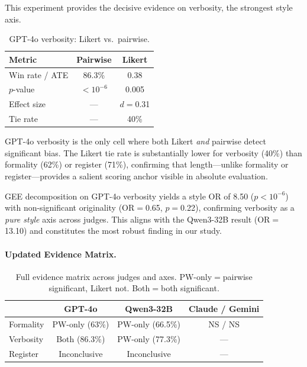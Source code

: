 \documentclass[11pt,a4paper]{article}
\begin{document}
This experiment provides the decisive evidence on verbosity, the strongest style axis.

\begin{table}[h]
\centering
\caption{GPT-4o verbosity: Likert vs.\ pairwise.}
\label{tab:verbosity}
\begin{tabular}{lcc}
\toprule
\textbf{Metric} & \textbf{Pairwise} & \textbf{Likert} \\
\midrule
Win rate / ATE & 86.3\% & 0.38 \\
$p$-value & $<10^{-6}$ & 0.005 \\
Effect size & --- & $d{=}$0.31 \\
Tie rate & --- & 40\% \\
\bottomrule
\end{tabular}
\end{table}

GPT-4o verbosity is the only cell where both Likert \emph{and} pairwise detect significant bias. The Likert tie rate is substantially lower for verbosity (40\%) than formality (62\%) or register (71\%), confirming that length---unlike formality or register---provides a salient scoring anchor visible in absolute evaluation.

GEE decomposition on GPT-4o verbosity yields a style OR of 8.50 ($p < 10^{-6}$) with non-significant originality (OR$=$0.65, $p{=}$0.22), confirming verbosity as a \emph{pure style} axis across judges. This aligns with the Qwen3-32B result (OR$=$13.10) and constitutes the most robust finding in our study.

\paragraph{Updated Evidence Matrix.}

\begin{table}[h]
\centering
\caption{Full evidence matrix across judges and axes. PW-only$=$pairwise significant, Likert not. Both$=$both significant.}
\label{tab:evidence}
\begin{tabular}{lccc}
\toprule
& \textbf{GPT-4o} & \textbf{Qwen3-32B} & \textbf{Claude / Gemini} \\
\midrule
Formality & PW-only (63\%) & PW-only (66.5\%) & NS / NS \\
Verbosity & Both (86.3\%) & PW-only (77.3\%) & --- \\
Register & Inconclusive & Inconclusive & --- \\
\bottomrule
\end{tabular}
\end{table}
\end{document}
